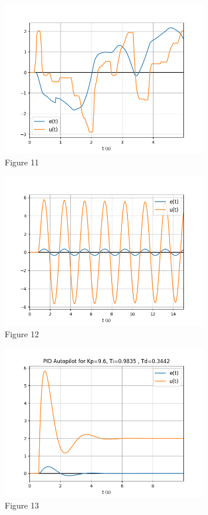 \documentclass[8pt]{article}
\begin{document}
\begin{figure}
    \centering
    \includegraphics[width=0.8\textwidth]{figures/FIGURE_11.png}
    \caption{Figure 11}
    \label{fig:figure11}
\end{figure}

\newpage

\begin{figure}
    \centering
    \includegraphics[width=0.8\textwidth]{figures/FIGURE_12.png}
    \caption{Figure 12}
    \label{fig:figure12}
\end{figure}

\begin{figure}
    \centering
    \includegraphics[width=0.8\textwidth]{figures/FIGURE_13.png}
    \caption{Figure 13}
    \label{fig:figure13}
\end{figure}
\end{document}
